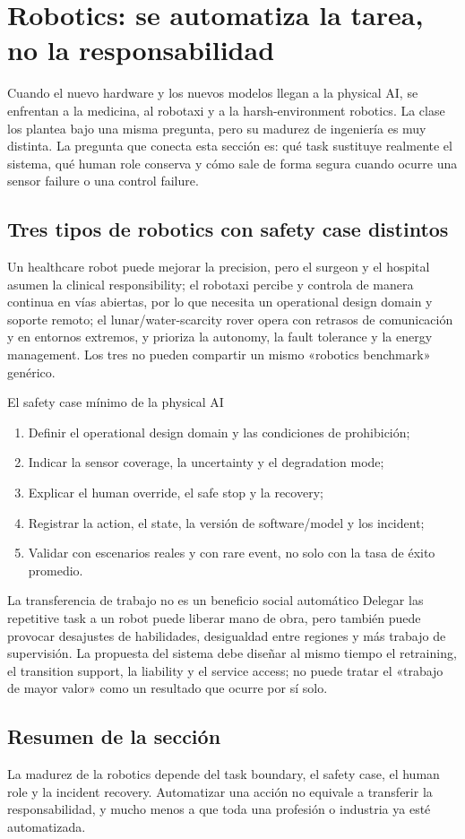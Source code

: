 \section{Robotics: se automatiza la tarea, no la responsabilidad}

Cuando el nuevo hardware y los nuevos modelos llegan a la physical AI, se enfrentan a la medicina, al robotaxi y a la harsh-environment robotics. La clase los plantea bajo una misma pregunta, pero su madurez de ingeniería es muy distinta. La pregunta que conecta esta sección es: qué task sustituye realmente el sistema, qué human role conserva y cómo sale de forma segura cuando ocurre una sensor failure o una control failure.

\subsection{Tres tipos de robotics con safety case distintos}

Un healthcare robot puede mejorar la precision, pero el surgeon y el hospital asumen la clinical responsibility; el robotaxi percibe y controla de manera continua en vías abiertas, por lo que necesita un operational design domain y soporte remoto; el lunar/water-scarcity rover opera con retrasos de comunicación y en entornos extremos, y prioriza la autonomy, la fault tolerance y la energy management. Los tres no pueden compartir un mismo «robotics benchmark» genérico.

\begin{importantbox}{El safety case mínimo de la physical AI}
\begin{enumerate}
  \item Definir el operational design domain y las condiciones de prohibición;
  \item Indicar la sensor coverage, la uncertainty y el degradation mode;
  \item Explicar el human override, el safe stop y la recovery;
  \item Registrar la action, el state, la versión de software/model y los incident;
  \item Validar con escenarios reales y con rare event, no solo con la tasa de éxito promedio.
\end{enumerate}
\end{importantbox}

\begin{warningbox}{La transferencia de trabajo no es un beneficio social automático}
Delegar las repetitive task a un robot puede liberar mano de obra, pero también puede provocar desajustes de habilidades, desigualdad entre regiones y más trabajo de supervisión. La propuesta del sistema debe diseñar al mismo tiempo el retraining, el transition support, la liability y el service access; no puede tratar el «trabajo de mayor valor» como un resultado que ocurre por sí solo.
\end{warningbox}

\subsection{Resumen de la sección}

La madurez de la robotics depende del task boundary, el safety case, el human role y la incident recovery. Automatizar una acción no equivale a transferir la responsabilidad, y mucho menos a que toda una profesión o industria ya esté automatizada.
